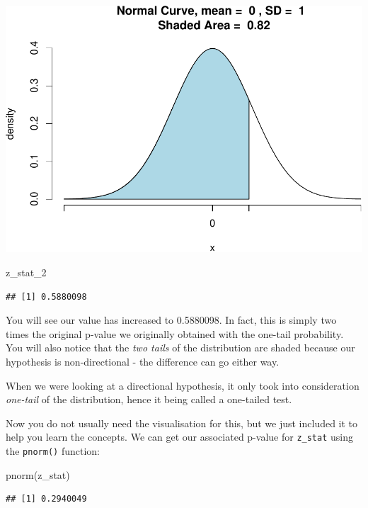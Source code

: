 \documentclass[
]{book}
\newenvironment{Shaded}{\begin{snugshade}}{\end{snugshade}}
\newcommand{\FunctionTok}[1]{\textcolor[rgb]{0.00,0.00,0.00}{#1}}
\newcommand{\NormalTok}[1]{#1}
\begin{document}
\includegraphics{06-hypotheses_files/figure-latex/unnamed-chunk-30-1.pdf}

\begin{Shaded}
\begin{Highlighting}[]
\NormalTok{z\_stat\_2 }
\end{Highlighting}
\end{Shaded}

\begin{verbatim}
## [1] 0.5880098
\end{verbatim}

You will see our value has increased to 0.5880098. In fact, this is simply two times the original p-value we originally obtained with the one-tail probability. You will also notice that the \emph{two tails} of the distribution are shaded because our hypothesis is non-directional - the difference can go either way.

When we were looking at a directional hypothesis, it only took into consideration \emph{one-tail} of the distribution, hence it being called a one-tailed test.

Now you do not usually need the visualisation for this, but we just included it to help you learn the concepts. We can get our associated p-value for \texttt{z\_stat} using the \texttt{pnorm()} function:

\begin{Shaded}
\begin{Highlighting}[]
\FunctionTok{pnorm}\NormalTok{(z\_stat)}
\end{Highlighting}
\end{Shaded}

\begin{verbatim}
## [1] 0.2940049
\end{verbatim}
\end{document}
